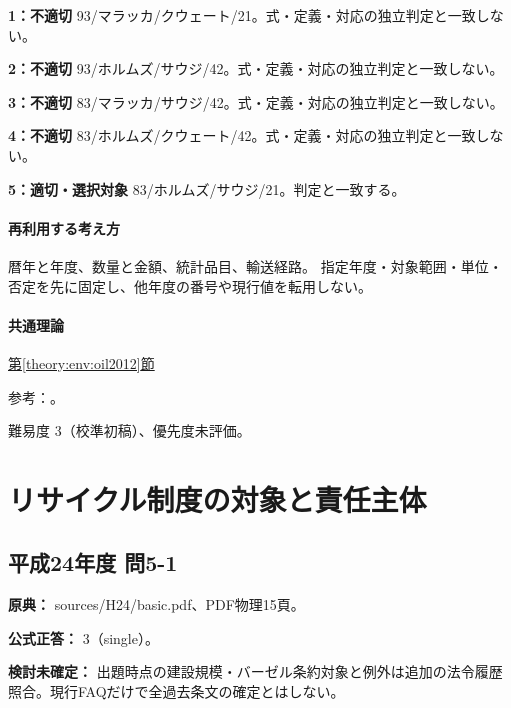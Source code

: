 \noindent\textbf{1：不適切} 93/マラッカ/クウェート/21。式・定義・対応の独立判定と一致しない。\par

\noindent\textbf{2：不適切} 93/ホルムズ/サウジ/42。式・定義・対応の独立判定と一致しない。\par

\noindent\textbf{3：不適切} 83/マラッカ/サウジ/42。式・定義・対応の独立判定と一致しない。\par

\noindent\textbf{4：不適切} 83/ホルムズ/クウェート/42。式・定義・対応の独立判定と一致しない。\par

\noindent\textbf{5：適切・選択対象} 83/ホルムズ/サウジ/21。判定と一致する。\par

\paragraph{再利用する考え方} 暦年と年度、数量と金額、統計品目、輸送経路。 指定年度・対象範囲・単位・否定を先に固定し、他年度の番号や現行値を転用しない。

\paragraph{共通理論} \hyperref[theory:env:oil2012]{第\ref*{theory:env:oil2012}節}

\par 参考：\cite{env58_oil}。

\par 難易度 3（校準初稿）、優先度未評価。

\section{リサイクル制度の対象と責任主体}

\subsection{平成24年度 問5-1}
\label{q:h24-reg-basic-5-1}

\noindent\textbf{原典：} sources/H24/basic.pdf、PDF物理15頁。

\textbf{公式正答：} 3（single）。

\par\textbf{検討未確定：} 出題時点の建設規模・バーゼル条約対象と例外は追加の法令履歴照合。現行FAQだけで全過去条文の確定とはしない。

